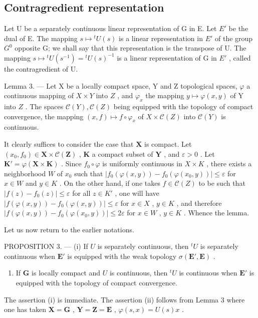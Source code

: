 \subsection{Contragredient representation}

Let U be a separately continuous linear representation of G in E. Let \(E'\) be the dual of E. The mapping \(s \mapsto {}^{t}U(s)\) is a linear representation in \(E'\) of the group \(G^{0}\) opposite G; we shall say that this representation is the transpose of U. The mapping \(s \mapsto {}^{t}U(s^{-1}) = {}^{t}U(s)^{-1}\) is a linear representation of G in \(E'\) , called the contragredient of U.

Lemma 3. --- Let X be a locally compact space, Y and Z topological spaces, \(\varphi\) a continuous mapping of \(X \times Y\) into \(Z\) , and \(\varphi_x\) the mapping \(y \mapsto \varphi(x, y)\) of Y into \(Z\) . The spaces \(\mathcal{C}(Y), \mathcal{C}(Z)\) being equipped with the topology of compact convergence, the mapping \((x, f) \mapsto f \circ \varphi_x\) of \(X \times \mathcal{C}(Z)\) into \(\mathcal{C}(Y)\) is continuous.

It clearly suffices to consider the case that \(\mathbf{X}\) is compact. Let \((x_0, f_0) \in \mathbf{X} \times \mathcal{C}(\mathbf{Z})\) , \(\mathbf{K}\) a compact subset of \(\mathbf{Y}\) , and \(\varepsilon > 0\) . Let \(\mathbf{K}' = \varphi(\mathbf{X} \times \mathbf{K})\) . Since \(f_0 \circ \varphi\) is uniformly continuous in \(X \times K\) , there exists a neighborhood \(W\) of \(x_0\) such that \(|f_0(\varphi(x, y)) - f_0(\varphi(x_0, y))| \leqslant \varepsilon\) for \(x \in W\) and \(y \in K\) . On the other hand, if one takes \(f \in \mathcal{C}(Z)\) to be such that \(|f(z) - f_0(z)| \leqslant \varepsilon\) for all \(z \in K'\) , one will have \(|f(\varphi(x, y)) - f_0(\varphi(x, y))| \leqslant \varepsilon\) for \(x \in X\) , \(y \in K\) , and therefore \(|f(\varphi(x, y)) - f_0(\varphi(x_0, y))| \leqslant 2\varepsilon\) for \(x \in W\) , \(y \in K\) . Whence the lemma.

Let us now return to the earlier notations.

PROPOSITION 3. --- (i) If \(U\) is separately continuous, then \({}^t U\) is separately continuous when \(\mathbf{E}'\) is equipped with the weak topology \(\sigma(\mathbf{E}',\mathbf{E})\) .

\begin{enumerate}
\def\labelenumi{(\roman{enumi})}
\setcounter{enumi}{1}
\tightlist
\item
  If \(\mathbf{G}\) is locally compact and \(U\) is continuous, then \({}^t U\) is continuous when \(\mathbf{E}'\) is equipped with the topology of compact convergence.
\end{enumerate}

The assertion (i) is immediate. The assertion (ii) follows from Lemma 3 where one has taken \(\mathbf{X} = \mathbf{G}\) , \(\mathbf{Y} = \mathbf{Z} = \mathbf{E}\) , \(\varphi(s, x) = U(s)x\) .


